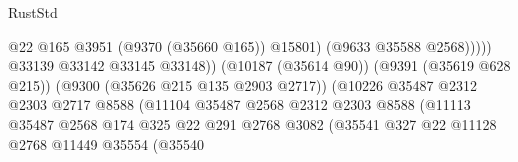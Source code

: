 \begin{lexlean}{RustStd}
\begin{coremodule}
                                                              @22
                                                              @165
                                                              @3951
                                                              (@9370 (@35660 @165))
                                                              @15801)
                                                            (@9633 @35588 @2568)))))
                                                    @33139
                                                    @33142
                                                    @33145
                                                    @33148))
                                                (@10187 (@35614 @90))
                                                (@9391 (@35619 @628 @215))
                                                (@9300 (@35626 @215 @135 @2903 @2717))
                                                (@10226
                                                  @35487
                                                  @2312
                                                  @2303
                                                  @2717
                                                  @8588
                                                  (@11104
                                                    @35487
                                                    @2568
                                                    @2312
                                                    @2303
                                                    @8588
                                                    (@11113
                                                      @35487
                                                      @2568
                                                      @174
                                                      @325
                                                      @22
                                                      @291
                                                      @2768
                                                      @3082
                                                      (@35541
                                                        @327
                                                        @22
                                                        @11128
                                                        @2768
                                                        @11449
                                                        @35554
                                                        (@35540

\end{coremodule}
\end{lexlean}
